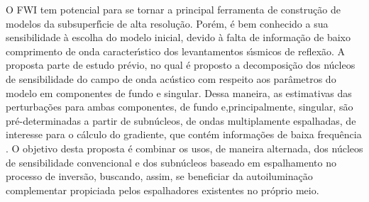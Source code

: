 O FWI tem potencial para se tornar a principal ferramenta de construção de modelos da subsuperfı́cie de alta resolução. Porém, é bem conhecido a sua sensibilidade à escolha do modelo inicial, devido à falta de informação de baixo comprimento de onda caracterı́stico dos levantamentos sı́smicos de reflexão. A proposta parte de estudo prévio, no qual é proposto a decomposição dos núcleos de sensibilidade do campo de onda acústico com respeito aos parâmetros do modelo em componentes de fundo e singular. Dessa maneira, as estimativas das perturbações para ambas componentes, de fundo e,principalmente, singular, são pré-determinadas a partir de subnúcleos, de ondas multiplamente espalhadas, de interesse para o cálculo do gradiente, que contém informações de baixa frequência \citep{macedo_2014}. O objetivo desta proposta é combinar os usos, de maneira alternada, dos núcleos de sensibilidade convencional e  dos subnúcleos baseado em espalhamento no processo de inversão, buscando, assim, se beneficiar da autoiluminação complementar propiciada pelos espalhadores existentes no próprio meio.









